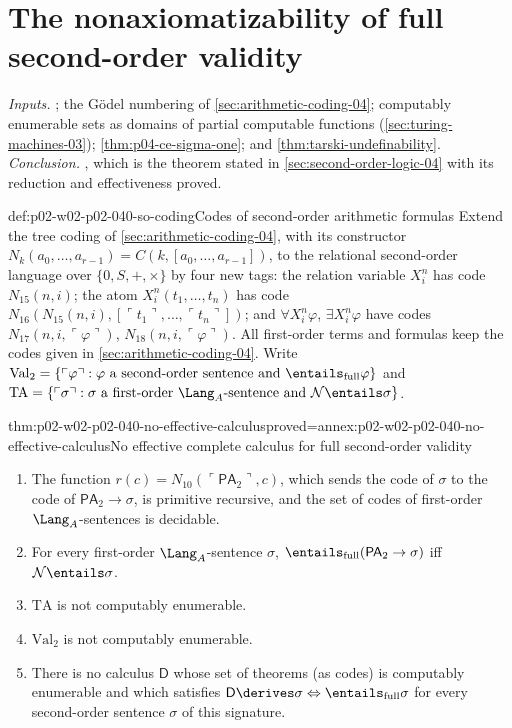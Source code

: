 \section{The nonaxiomatizability of full second-order validity}
\label{sec:p02-w02-p02-040-nonaxiomatizable}

\emph{Inputs.}  ; the G\"odel
numbering of \cref{sec:arithmetic-coding-04}; computably enumerable sets
as domains of partial computable functions (\cref{sec:turing-machines-03});
\cref{thm:p04-ce-sigma-one}; and \cref{thm:tarski-undefinability}.
\emph{Conclusion.}  , which
is the theorem stated in \cref{sec:second-order-logic-04} with its
reduction and effectiveness proved.

\begin{hbdefinition}{def:p02-w02-p02-040-so-coding}{Codes of second-order arithmetic formulas}
Extend the tree coding of \cref{sec:arithmetic-coding-04}, with its
constructor \(N_k(a_0,\ldots,a_{r-1})=C(k,[a_0,\ldots,a_{r-1}])\), to the
relational second-order language over \(\{0,S,+,\times\}\) by four new
tags: the relation variable \(X^n_i\) has code \(N_{15}(n,i)\); the atom
\(X^n_i(t_1,\ldots,t_n)\) has code
\(N_{16}(N_{15}(n,i),[\ulcorner t_1\urcorner,\ldots,\ulcorner t_n\urcorner])\);
and \(\forall X^n_i\varphi\), \(\exists X^n_i\varphi\) have codes
\(N_{17}(n,i,\ulcorner\varphi\urcorner)\), \(N_{18}(n,i,\ulcorner\varphi\urcorner)\).
All first-order terms and formulas keep the codes given in
\cref{sec:arithmetic-coding-04}.  Write
\(\mathrm{Val}_2=\{\ulcorner\varphi\urcorner:\varphi\text{ a second-order sentence and }\entails_{\mathrm{full}}\varphi\}\)
and \(\mathrm{TA}=\{\ulcorner\sigma\urcorner:\sigma\text{ a first-order }\Lang_A\text{-sentence and }\mathcal N\entails\sigma\}\).
\end{hbdefinition}

\begin{hbtheorem}{thm:p02-w02-p02-040-no-effective-calculus}{proved=annex:p02-w02-p02-040-no-effective-calculus}{No effective complete calculus for full second-order validity}
\begin{enumerate}
 \item The function \(r(c)=N_{10}(\ulcorner\mathsf{PA}_2\urcorner,c)\), which
   sends the code of \(\sigma\) to the code of \(\mathsf{PA}_2\to\sigma\), is
   primitive recursive, and the set of codes of first-order
   \(\Lang_A\)-sentences is decidable.
 \item For every first-order \(\Lang_A\)-sentence \(\sigma\),
   \(\entails_{\mathrm{full}}(\mathsf{PA}_2\to\sigma)\) iff
   \(\mathcal N\entails\sigma\).
 \item \(\mathrm{TA}\) is not computably enumerable.
 \item \(\mathrm{Val}_2\) is not computably enumerable.
 \item There is no calculus \(\mathsf D\) whose set of theorems (as codes) is
   computably enumerable and which satisfies
   \(\mathsf D\derives\sigma\Leftrightarrow\entails_{\mathrm{full}}\sigma\) for
   every second-order sentence \(\sigma\) of this signature.
\end{enumerate}
\end{hbtheorem}

